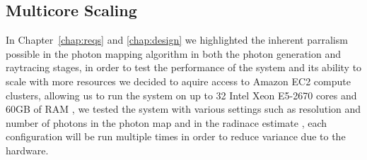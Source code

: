 \subsection{Multicore Scaling}
In Chapter~\ref{chap:reqs} and \ref{chap:design} we highlighted the inherent parralism possible in the
photon mapping algorithm in both the photon generation and raytracing stages, in order to
test the performance of the system and its ability to scale with more resources we decided to
aquire access to Amazon EC2 compute clusters, allowing us to run the system on up to 32 Intel
Xeon E5-2670 cores and 60GB of RAM \cite{amazon-instances}, we tested the system with various
settings such as resolution and number of photons in the photon map and in the radinace estimate
, each configuration will be run multiple times in order to reduce variance due to the hardware.

